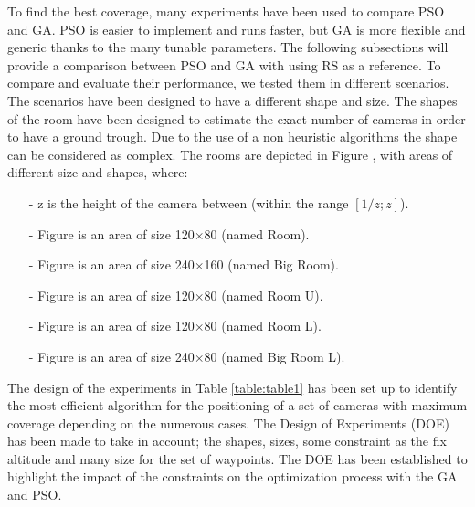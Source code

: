 To find the best coverage, many experiments have been used to compare PSO and GA. PSO is easier to implement and runs faster, but GA is more flexible and generic thanks to the many tunable parameters. 
The following subsections will provide a comparison between PSO and GA with using RS as a reference.%
To compare and evaluate their performance, we tested them in different scenarios. The scenarios have been  designed to have a different shape and size. The shapes of the room have been designed to estimate the exact number of cameras in order to have a ground trough. Due to the use of a non heuristic algorithms the shape can be considered as complex. The rooms are depicted in Figure , with areas of different size and shapes, where: 




\begin{itemize}
\item[-]    z is the height of the camera between (within the range $[1/z;z]$).
\item[-]	Figure  is an area of size 120$\times$80 (named Room). 
\item[-]	Figure  is an area of size 240$\times$160 (named Big Room).
\item[-]	Figure  is an area of size 120$\times$80 (named Room U).
\item[-]	Figure  is an area of size 120$\times$80 (named Room L).
\item[-]	Figure  is an area of size 240$\times$80 (named Big Room L).
\end{itemize}


The design of the experiments in Table \ref{table:table1} has been set up to identify the most efficient algorithm for the positioning of a set of cameras with maximum coverage depending on the numerous cases. 
The Design of Experiments (DOE) has been made to take in account; the  shapes, sizes, some constraint as the fix altitude and  many size for the set of waypoints. The DOE has been established to highlight the impact of the constraints on the optimization process with the GA and PSO.


